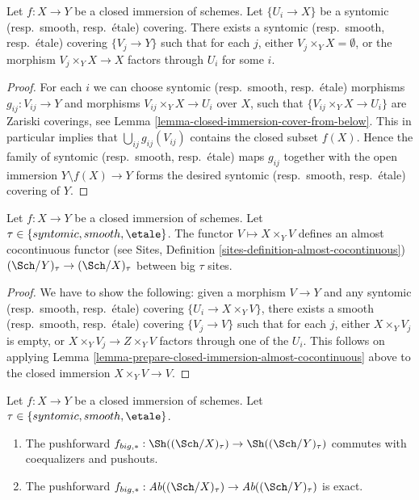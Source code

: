 \begin{lemma}
\label{lemma-prepare-closed-immersion-almost-cocontinuous}
Let $f : X \to Y$ be a closed immersion of schemes.
Let $\{U_i \to X\}$ be a syntomic (resp.\ smooth, resp.\ \'etale) covering.
There exists a syntomic (resp.\ smooth, resp.\ \'etale) covering $\{V_j \to Y\}$
such that for each $j$, either $V_j \times_Y X = \emptyset$, or the
morphism $V_j \times_Y X \to X$ factors through $U_i$ for some $i$.
\end{lemma}

\begin{proof}
For each $i$ we can choose syntomic (resp.\ smooth, resp.\ \'etale) morphisms
$g_{ij} : V_{ij} \to Y$ and morphisms $V_{ij} \times_Y X \to U_i$ over $X$,
such that $\{V_{ij} \times_Y X \to U_i\}$ are Zariski coverings, see
Lemma \ref{lemma-closed-immersion-cover-from-below}.
This in particular implies that
$\bigcup_{ij} g_{ij}(V_{ij})$ contains the closed subset $f(X)$.
Hence the family of syntomic (resp.\ smooth, resp.\ \'etale) maps $g_{ij}$
together with the open immersion $Y \setminus f(X) \to Y$ forms the desired
syntomic (resp.\ smooth, resp.\ \'etale) covering of $Y$.
\end{proof}

\begin{lemma}
\label{lemma-closed-immersion-almost-cocontinuous}
Let $f : X \to Y$ be a closed immersion of schemes.
Let $\tau \in \{syntomic, smooth, \etale\}$.
The functor $V \mapsto X \times_Y V$ defines an almost
cocontinuous functor (see
Sites, Definition \ref{sites-definition-almost-cocontinuous})
$(\Sch/Y)_\tau \to (\Sch/X)_\tau$ between
big $\tau$ sites.
\end{lemma}

\begin{proof}
We have to show the following: given a morphism $V \to Y$
and any syntomic (resp.\ smooth, resp.\ \'etale)
covering $\{U_i \to X \times_Y V\}$, there exists a
smooth (resp.\ smooth, resp.\ \'etale) covering $\{V_j \to V\}$
such that for each $j$, either $X \times_Y V_j$ is empty, or
$X \times_Y V_j \to Z \times_Y V$ factors through one of
the $U_i$. This follows on applying
Lemma \ref{lemma-prepare-closed-immersion-almost-cocontinuous}
above to the closed immersion $X \times_Y V \to V$.
\end{proof}

\begin{lemma}
\label{lemma-closed-immersion-pushforward-exact}
Let $f : X \to Y$ be a closed immersion of schemes.
Let $\tau \in \{syntomic, smooth, \etale\}$.
\begin{enumerate}
\item The pushforward
$f_{big, *} :
\Sh((\Sch/X)_\tau)
\to
\Sh((\Sch/Y)_\tau)$
commutes with coequalizers and pushouts.
\item The pushforward
$f_{big, *} :
\textit{Ab}((\Sch/X)_\tau)
\to
\textit{Ab}((\Sch/Y)_\tau)$
is exact.
\end{enumerate}
\end{lemma}


